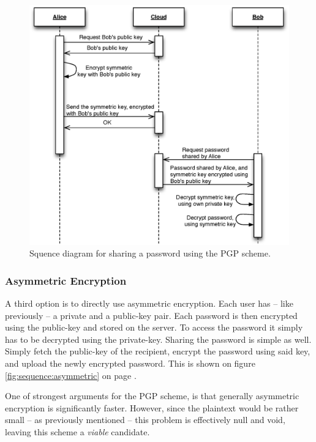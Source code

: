 				\begin{figure}[h!]
					\centering
					\includegraphics[width=\textwidth]{figures/design/uml/sequence/sharing-pgp.eps}
					\caption{Squence diagram for sharing a password using the PGP scheme.}
					\label{fig:sequence:pgp}
				\end{figure}

			\subsubsection{Asymmetric Encryption}
				\label{sec:assymetric}
				A third option is to directly use asymmetric encryption. Each user has -- like previously -- a private and a public-key pair. Each password is then encrypted using the public-key and stored on the server. To access the password it simply has to be decrypted using the private-key. Sharing the password is simple as well. Simply fetch the public-key of the recipient, encrypt the password using said key, and upload the newly encrypted password. This is shown on figure \ref{fig:sequence:asymmetric} on page \pageref{fig:sequence:asymmetric}.

				One of strongest arguments for the PGP scheme, is that generally asymmetric encryption is significantly faster. However, since the plaintext would be rather small -- as previously mentioned -- this problem is effectively null and void, leaving this scheme a \emph{viable} candidate.

